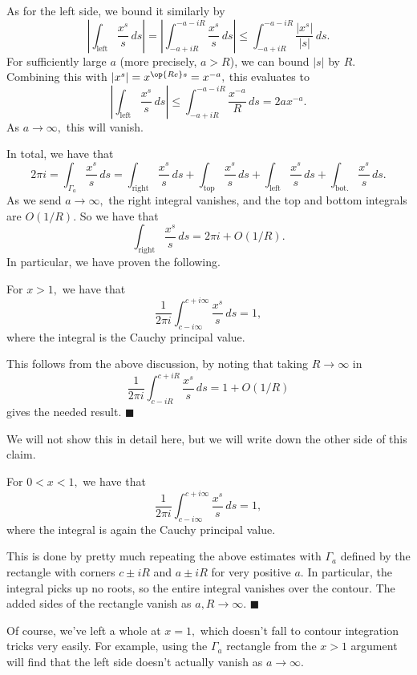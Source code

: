 As for the left side, we bound it similarly by
\[\left|\int_{\text{left}}\frac{x^s}s\,ds\right|=\left|\int_{-a+iR}^{-a-iR}\frac{x^s}s\,ds\right|\le\int_{-a+iR}^{-a-iR}\frac{\left|x^s\right|}{|s|}\,ds.\]
For sufficiently large $a$ (more precisely, $a>R$), we can bound $|s|$ by $R.$ Combining this with $\left|x^s\right|=x^{\op{Re}s}=x^{-a},$ this evaluates to
\[\left|\int_{\text{left}}\frac{x^s}s\,ds\right|\le\int_{-a+iR}^{-a-iR}\frac{x^{-a}}R\,ds=2ax^{-a}.\]
As $a\to\infty,$ this will vanish.

In total, we have that
\[2\pi i=\int_{\Gamma_a}\frac{x^s}s\,ds=\int_{\text{right}}\frac{x^s}s\,ds+\int_{\text{top}}\frac{x^s}s\,ds+\int_{\text{left}}\frac{x^s}s\,ds+\int_{\text{bot.}}\frac{x^s}s\,ds.\]
As we send $a\to\infty,$ the right integral vanishes, and the top and bottom integrals are $O(1/R).$ So we have that
\[\int_{\text{right}}\frac{x^s}s\,ds=2\pi i+O(1/R).\]
In particular, we have proven the following.
\begin{proposition}
    For $x>1,$ we have that
    \[\frac1{2\pi i}\int_{c-i\infty}^{c+i\infty}\frac{x^s}s\,ds=1,\]
    where the integral is the Cauchy principal value.
\end{proposition}
This follows from the above discussion, by noting that taking $R\to\infty$ in
\[\frac1{2\pi i}\int_{c-iR}^{c+iR}\frac{x^s}s\,ds=1+O(1/R)\]
gives the needed result. $\blacksquare$

We will not show this in detail here, but we will write down the other side of this claim.
\begin{proposition}
    For $0<x<1,$ we have that
    \[\frac1{2\pi i}\int_{c-i\infty}^{c+i\infty}\frac{x^s}s\,ds=1,\]
    where the integral is again the Cauchy principal value.
\end{proposition}
This is done by pretty much repeating the above estimates with $\Gamma_a$ defined by the rectangle with corners $c\pm iR$ and $a\pm iR$ for very positive $a.$ In particular, the integral picks up no roots, so the entire integral vanishes over the contour. The added sides of the rectangle vanish as $a,R\to\infty.$ $\blacksquare$

Of course, we've left a whole at $x=1,$ which doesn't fall to contour integration tricks very easily. For example, using the $\Gamma_a$ rectangle from the $x>1$ argument will find that the left side doesn't actually vanish as $a\to\infty.$

